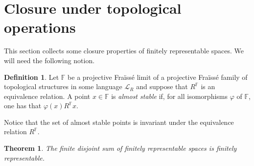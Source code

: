 \documentclass[12pt,twoside,a4paper]{amsart}
\theoremstyle{plain}
\newtheorem{theorem}{Theorem}
\theoremstyle{definition}
\newtheorem{definition}{Definition}
\begin{document}
\section{Closure under topological operations} \label{sum-prod}
This section collects some closure properties of finitely representable spaces.
We will need the following notion.

\begin{definition}
Let $ \mathbb F $ be a projective Fra\"iss\'e limit of a projective Fra\"iss\'e family of topological structures in some language $ \mathcal L_R$ and suppose that $R^{ \mathbb F }$ is an equivalence relation.
A point $x\in \mathbb F $ is {\it almost stable} if, for all isomorphisms $ {\varphi} $ of $ \mathbb F $, one has that $ {\varphi} (x)R^{ \mathbb F }x$.
\end{definition}

Notice that the set of almost stable points is invariant under the equivalence relation $R^{ \mathbb F }$.

\begin{theorem} \label{closurefinitesums}
The finite disjoint sum of finitely representable spaces is finitely representable.
\end{theorem}
\end{document}
